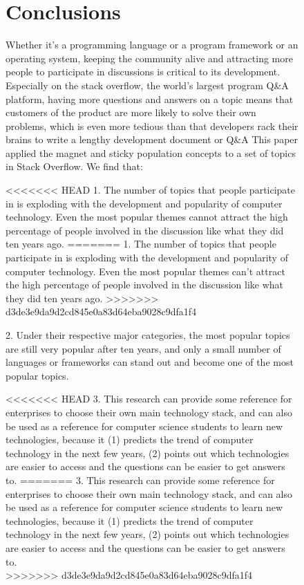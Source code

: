 \documentclass[conference]{IEEEtran}
\begin{document}
\begin{figure}[t]
\begin{oframed}
\begin{oframed}
\section{Conclusions}

Whether it's a programming language or a program framework or an operating system, keeping the community alive and attracting more people to participate in discussions is critical to its development. Especially on the stack overflow, the world's largest program Q\&A platform, having more questions and answers on a topic means that customers of the product are more likely to solve their own problems, which is even more tedious than that developers rack their brains to write a lengthy development document or Q\&A This paper applied the magnet and sticky population concepts to a set of topics in Stack Overflow. We find that:

<<<<<<< HEAD
1. The number of topics that people participate in is exploding with the development and popularity of computer technology. Even the most popular themes cannot attract the high percentage of people involved in the discussion like what they did ten years ago.
=======
1. The number of topics that people participate in is exploding with the development and popularity of computer technology. Even the most popular themes can't attract the high percentage of people involved in the discussion like what they did ten years ago.
>>>>>>> d3de3e9da9d2cd845e0a83d64eba9028c9dfa1f4
\smallskip\smallskip

2. Under their respective major categories, the most popular topics are still very popular after ten years, and only a small number of languages or frameworks can stand out and become one of the most popular topics.
\smallskip\smallskip

<<<<<<< HEAD
3. This research can provide some reference for enterprises to choose their own main technology stack, and can also be used as a reference for computer science students to learn new technologies, because it (1) predicts the trend of computer technology in the next few years, (2) points out which technologies are easier to access and the questions can be easier to get answers to.
=======
3. This research can provide some reference for enterprises to choose their own main technology stack, and can also be used as a reference for computer science students to learn new technologies, because it (1) predicts the trend of computer technology in the next few years, (2) points out which technologies are easier to access and the questions can be easier to get answers to.\\
>>>>>>> d3de3e9da9d2cd845e0a83d64eba9028c9dfa1f4



\end{oframed}
\end{oframed}
\end{figure}
\end{document}
